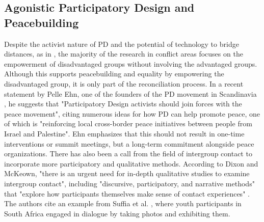 \documentclass[dissertation,math,vertlayout,pdfa,colorlinks]{aaltoseries}
\begin{document}
\subsection{Agonistic Participatory Design and Peacebuilding}
Despite the activist nature of PD and the potential of technology to bridge distances, as in \cite{clarkeDecolonisingParticipatoryDesign2022}, the majority of the research in conflict areas focuses on the empowerment of disadvantaged groups without involving the advantaged groups. Although this supports peacebuilding and equality by empowering the disadvantaged group, it is only part of the reconciliation process. In a recent statement by Pelle Ehn, one of the founders of the PD movement in Scandinavia \cite[p.293]{bodkerAfterthoughtsEmergentFuture2025}, he suggests that "Participatory Design activists should join forces with the peace movement", citing numerous ideas for how PD can help promote peace, one of which is "reinforcing local cross-border peace initiatives between people from Israel and Palestine". Ehn emphasizes that this should not result in one-time interventions or summit meetings, but a long-term commitment alongside peace organizations. There has also been a call from the field of intergroup contact to incorporate more participatory and qualitative methods. According to Dixon and McKeown, "there is an urgent need for in-depth qualitative studies to examine intergroup contact", including "discursive, participatory, and narrative methods" that "explore how participants themselves make sense of contact experiences" \cite{dixonNegativeContactCollective2021}. The authors cite an example from Suffia et al. \cite{sufflaPhotovoiceCommunityEngaged2012}, where youth participants in South Africa engaged in dialogue by taking photos and exhibiting them.
\end{document}
